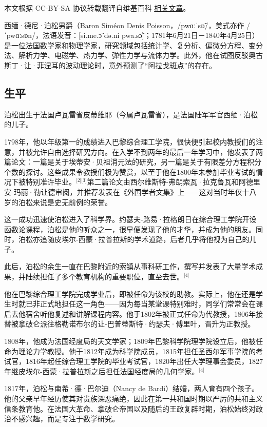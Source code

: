 
本文根据 CC-BY-SA 协议转载翻译自维基百科 \href{https://en.wikipedia.org/wiki/Sim\%C3\%A9on_Denis_Poisson}{相关文章}。

西缅·德尼·泊松男爵（Baron Siméon Denis Poisson，/pwɑːˈsɒ̃/，美式亦作 /ˈpwɑːsɒn/，法语发音：[si.me.ɔ̃ də.ni pwa.sɔ̃]；1781年6月21日－1840年4月25日）是一位法国数学家和物理学家，研究领域包括统计学、复分析、偏微分方程、变分法、解析力学、电磁学、热力学、弹性力学与流体力学。此外，他在试图反驳奥古斯丁·让·菲涅耳的波动理论时，意外预测了“阿拉戈斑点”的存在。
\subsection{生平}
泊松出生于法国卢瓦雷省皮蒂维耶（今属卢瓦雷省），是法国陆军军官西缅·泊松的儿子。

1798年，他以年级第一的成绩进入巴黎综合理工学院，很快便引起校内教授们的注意，并被允许自由选择研究方向。在入学不到两年的最后一年学习中，他发表了两篇论文：一篇是关于埃蒂安·贝祖消元法的研究，另一篇是关于有限差分方程积分个数的探讨。这些成果令教授们极为赞赏，以至于他在1800年未参加毕业考试的情况下被特别准许毕业。\(^\text{[2][3]}\)第二篇论文由西尔维斯特-弗朗索瓦·拉克鲁瓦和阿德里安-玛丽·勒让德审阅，并推荐发表在《外国学者文集》上——这对当时年仅十八岁的泊松来说是史无前例的荣誉。

这一成功迅速使泊松进入了科学界。约瑟夫-路易·拉格朗日在综合理工学院开设函数论课程，泊松是他的听众之一，很早便发现了他的才华，并成为他的朋友。同时，泊松亦追随皮埃尔-西蒙·拉普拉斯的学术道路，后者几乎将他视为自己的儿子。

此后，泊松的余生一直在巴黎附近的索镇从事科研工作，撰写并发表了大量学术成果，并陆续担任了多个教育机构的重要职位，直至去世。\(^\text{[4]}\)

他在巴黎综合理工学院完成学业后，即被任命为该校的助教。实际上，他在还是学生时就已非正式地担任这一角色——因为每当某堂课特别难时，同学们常常会在课后去他宿舍听他复述和讲解课程内容。他于1802年被正式任命为代教授，1806年接替被拿破仑派往格勒诺布尔的让-巴普蒂斯特·约瑟夫·傅里叶，晋升为正教授。

1808年，他成为法国经度局的天文学家；1809年巴黎科学院理学院设立后，他被任命为理论力学教授。他于1812年成为科学院成员，1815年担任圣西尔军事学院的考试官，1816年起任综合理工学院的毕业考试官，1820年出任大学理事会委员，1827年继皮埃尔-西蒙·拉普拉斯之后担任法国经度局的几何学家。\(^\text{[4]}\)

1817年，泊松与南希·德·巴尔迪（Nancy de Bardi）结婚，两人育有四个孩子。他的父亲早年经历使其对贵族深恶痛绝，因此在第一共和国时期以严厉的共和主义信条教育他。在法国大革命、拿破仑帝国以及随后的王政复辟时期，泊松始终对政治不感兴趣，而是专注于数学研究。

